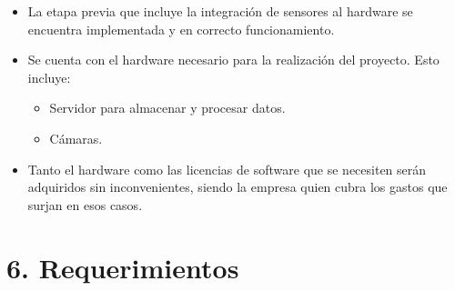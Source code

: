 \documentclass[
11pt, %
codirector, %
]{charter}
\begin{document}
\begin{itemize}
	\item La etapa previa que incluye la integración de sensores al hardware se encuentra implementada y en correcto funcionamiento.
	\item Se cuenta con el hardware necesario para la realización del proyecto. Esto incluye:
\begin{itemize}
	\item Servidor para almacenar y procesar datos.
	\item Cámaras.
\end{itemize}
	\item Tanto el hardware como las licencias de software que se necesiten serán adquiridos sin inconvenientes, siendo la empresa quien cubra los gastos que surjan en esos casos.
	
\end{itemize}

\section{6. Requerimientos}
\label{sec:requerimientos}
\end{document}

